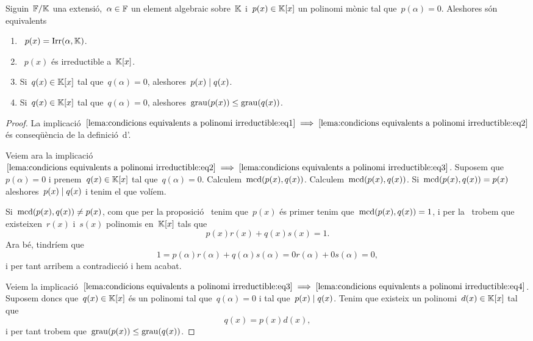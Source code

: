 \documentclass[../../Main.tex]{subfiles}
\begin{document}
	\begin{lemma}
		\label{lema:condicions equivalents a polinomi irreductible}
		Siguin~\(\mathbb{F}/\mathbb{K}\) una extensió,~\(\alpha\in\mathbb{F}\) un element algebraic sobre~\(\mathbb{K}\) i~\(p(x)\in\mathbb{K}[x]\) un polinomi mònic tal que~\(p(\alpha)=0\).
		Aleshores són equivalents
		\begin{enumerate}
		\item\label{lema:condicions equivalents a polinomi irreductible:eq1}~\(p(x)=\operatorname{Irr}(\alpha,\mathbb{K})\).
		\item\label{lema:condicions equivalents a polinomi irreductible:eq2}~\(p(x)\) és irreductible a~\(\mathbb{K}[x]\).
		\item\label{lema:condicions equivalents a polinomi irreductible:eq3} Si~\(q(x)\in\mathbb{K}[x]\) tal que~\(q(\alpha)=0\), aleshores~\(p(x)\mathrel{|} q(x)\).
		\item\label{lema:condicions equivalents a polinomi irreductible:eq4} Si~\(q(x)\in\mathbb{K}[x]\) tal que~\(q(\alpha)=0\), aleshores~\(\operatorname{grau}(p(x))\leq\operatorname{grau}(q(x))\).
		\end{enumerate}
		\begin{proof}
			La implicació~\(\eqref{lema:condicions equivalents a polinomi irreductible:eq1}\implies\eqref{lema:condicions equivalents a polinomi irreductible:eq2}\) és conseqüència de la definició~d'.
			
			Veiem ara la implicació~\(\eqref{lema:condicions equivalents a polinomi irreductible:eq2}\implies\eqref{lema:condicions equivalents a polinomi irreductible:eq3}\).
			Suposem que~\(p(\alpha)=0\) i prenem~\(q(x)\in\mathbb{K}[x]\) tal que~\(q(\alpha)=0\).
			Calculem~\(\operatorname{mcd}(p(x),q(x))\).
			Calculem~\(\operatorname{mcd}(p(x),q(x))\).
			Si~\(\operatorname{mcd}(p(x),q(x))=p(x)\) aleshores~\(p(x)\mathrel{|} q(x)\) i tenim el que volíem.
			
			Si~\(\operatorname{mcd}(p(x),q(x))\neq p(x)\), com que per la proposició~ tenim que~\(p(x)\) és primer tenim que~\(\operatorname{mcd}(p(x),q(x))=1\), i per la~ trobem que existeixen~\(r(x)\) i~\(s(x)\) polinomis en~\(\mathbb{K}[x]\) tals que
			\[
			    p(x)r(x)+q(x)s(x)=1.
			\]
			Ara bé, tindríem que
			\[
				1=p(\alpha)r(\alpha)+q(\alpha)s(\alpha)=0r(\alpha)+0s(\alpha)=0,
			\]
			i per tant arribem a contradicció i hem acabat.
			
			Veiem la implicació~\(\eqref{lema:condicions equivalents a polinomi irreductible:eq3}\implies\eqref{lema:condicions equivalents a polinomi irreductible:eq4}\).
			Suposem doncs que~\(q(x)\in\mathbb{K}[x]\) és un polinomi tal que~\(q(\alpha)=0\) i tal que~\(p(x)\mathrel{|} q(x)\).
			Tenim que existeix un polinomi~\(d(x)\in\mathbb{K}[x]\) tal que
			\[
			    q(x)=p(x)d(x),
			\]
			i per tant trobem que~\(\operatorname{grau}(p(x))\leq\operatorname{grau}(q(x))\).
			

\end{proof}
\end{lemma}
\end{document}
